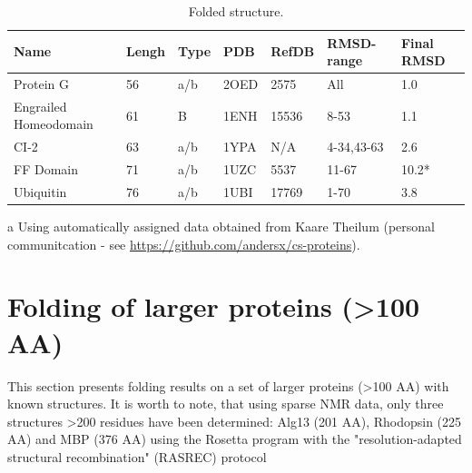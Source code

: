 \begin{table}[h]
    \caption{Folded structure.}
    \begin{center}
    \begin{threeparttable}
    \begin{tabular}{l l l l l  l l}
Name                & Lengh    & Type & PDB     & RefDB     & RMSD-range    & Final RMSD  \\\hline
Protein G           & 56       & a/b & 2OED    & 2575      & All           & 1.0           \\
Engrailed Homeodomain & 61     & B   & 1ENH    & 15536     & 8-53          & 1.1           \\
CI-2                & 63       & a/b & 1YPA    & N/A\tnote{a}& 4-34,43-63  & 2.6          \\
FF Domain           & 71       & a/b & 1UZC    & 5537      & 11-67         & 10.2*          \\
Ubiquitin           & 76       & a/b & 1UBI    & 17769     & 1-70          & 3.8
    \end{tabular}
    \begin{tablenotes}
    \item[a] Using automatically assigned data obtained from Kaare Theilum (personal communitcation - see \url{https://github.com/andersx/cs-proteins}).
    \end{tablenotes}
    \end{threeparttable}
    \end{center}
    \label{tab:folding_small}
\end{table}

\section{Folding of larger proteins (\textgreater 100 AA)}

This section presents folding results on a set of larger proteins (\textgreater 100 AA) with known structures. It is worth to note, that using sparse NMR data, only three structures \textgreater 200 residues have been determined: Alg13 (201 AA), Rhodopsin (225 AA) and MBP (376 AA) using the Rosetta program with the "resolution-adapted structural recombination" (RASREC) protocol

